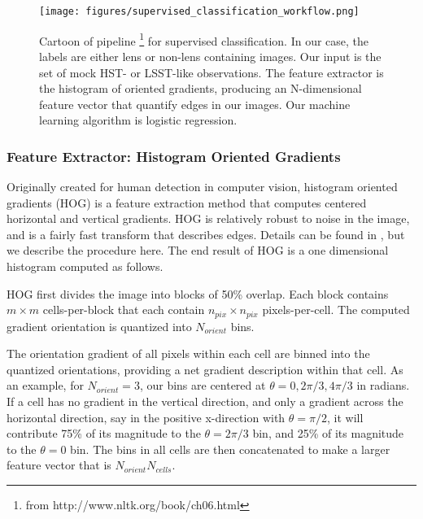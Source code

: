 \documentclass{emulateapj}
\begin{document}
\begin{figure}[t]\label{fig:pipeline}
\begin{center}
\texttt{[image: figures/supervised\_classification\_workflow.png]}
\caption{Cartoon of pipeline \footnote{from
    http://www.nltk.org/book/ch06.html} for supervised classification.
  In our case, the labels are either lens or non-lens containing
  images.  Our input is the set of mock HST- or LSST-like
  observations.  The feature extractor is the histogram of oriented
  gradients, producing an N-dimensional feature vector that quantify
  edges in our images.  Our machine learning algorithm is logistic
  regression.}
\end{center}
\end{figure}

\subsubsection{Feature Extractor: Histogram Oriented Gradients}\label{sec:hog}
Originally created for human detection in computer vision, histogram
oriented gradients (HOG) is a feature extraction method that computes
centered horizontal and vertical gradients. HOG is relatively robust
to noise in the image, and is a fairly fast transform that describes
edges.  Details can be found in \citet{dalalandtriggs_05}, but we
describe the procedure here.  The end result of HOG is a one
dimensional histogram computed as follows.

HOG first divides the image into blocks of 50\% overlap.  Each block
contains $m\times m$ cells-per-block that each contain $n_{pix}\times
n_{pix}$ pixels-per-cell.  The computed gradient orientation is
quantized into $N_{orient}$ bins.

The orientation gradient of all pixels within each cell are binned
into the quantized orientations, providing a net gradient description
within that cell.  As an example, for $N_{orient}=3$, our bins are
centered at $\theta=0, 2\pi/3, 4\pi/3$ in radians.  If a cell has no
gradient in the vertical direction, and only a gradient across the
horizontal direction, say in the positive x-direction with
$\theta=\pi/2$, it will contribute 75\% of its magnitude to the
$\theta=2\pi/3$ bin, and 25\% of its magnitude to the $\theta=0$ bin.
The bins in all cells are then concatenated to make a larger feature
vector that is $N_{orient}$\times$N_{cells}$.
\end{document}
